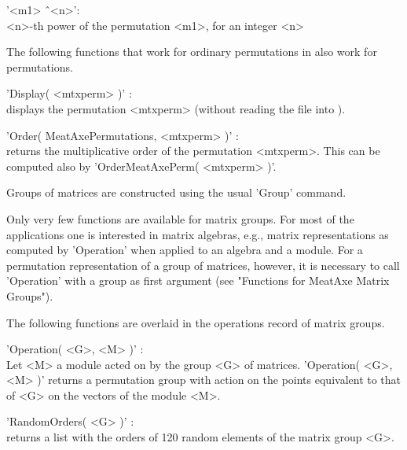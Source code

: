 '<m1> \^\ <n>':\\  <n>-th power of the {\MeatAxe} permutation <m1>,
                   for an integer <n>


The following functions that work for ordinary permutations in {\GAP} also
work for {\MeatAxe} permutations.

'Display( <mtxperm> )' : \\
     displays the {\MeatAxe} permutation <mtxperm> (without reading the file
     into {\GAP}).

'Order( MeatAxePermutations, <mtxperm> )' : \\
     returns the multiplicative order of the {\MeatAxe} permutation
     <mtxperm>.
     This can be computed also by 'OrderMeatAxePerm( <mtxperm> )'.


Groups of {\MeatAxe} matrices are constructed using the usual 'Group'
command.

Only very few functions are available for {\MeatAxe} matrix groups.
For most of the applications one is interested in matrix algebras, e.g., 
matrix representations as computed by 'Operation' when applied to an
algebra and a module.  For a permutation representation of a group of
{\MeatAxe} matrices, however, it is necessary to call 'Operation'
with a group as first argument (see "Functions for MeatAxe Matrix Groups").


The following functions are overlaid in the operations record of
{\MeatAxe} matrix groups.

'Operation( <G>, <M> )' : \\
     Let <M> a {\MeatAxe} module acted on by the group <G> of {\MeatAxe}
     matrices.
     'Operation( <G>, <M> )' returns a permutation group with action on
     the points equivalent to that of <G> on the vectors of the module <M>.

'RandomOrders( <G> )' : \\
     returns a list with the orders of 120 random elements of the {\MeatAxe}
     matrix group <G>.


